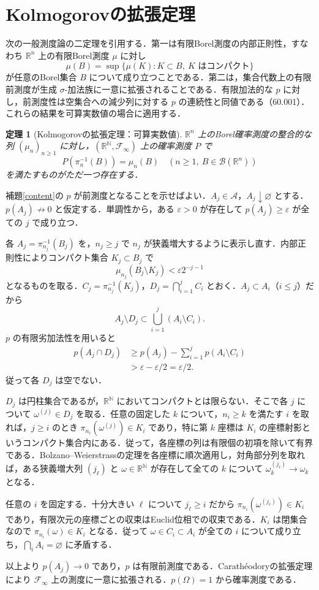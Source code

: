 \documentclass[a5paper,10pt,onecolumn]{jsarticle}
\makeatletter
\theoremstyle{mathnotetheorem}
\newtheorem{theorem}{定理}[section]
\renewcommand{\proofname}{証明}
\renewenvironment{proof}[1][\proofname]{%
  \par\pushQED{\qed}\normalfont\topsep4\p@\@plus2\p@\relax
  \trivlist\item[\hskip\labelsep\bfseries #1]\ignorespaces
}{\popQED\endtrivlist\@endpefalse}
\newcommand{\R}{\mathbb{R}}
\newcommand{\N}{\mathbb{N}}
\newcommand{\F}{\mathcal F}
\newcommand{\B}{\mathcal B}
\newcommand{\1}{\mathbf{1}}
\makeatother
\begin{document}
\section{Kolmogorovの拡張定理}
次の一般測度論の二定理を引用する．第一は有限Borel測度の内部正則性，すなわち $\R^n$ 上の有限Borel測度 $\mu$ に対し
\[
 \mu(B)=\sup\{\mu(K):K\subset B,\ K\text{ はコンパクト}\}
\]
が任意のBorel集合 $B$ について成り立つことである．第二は，集合代数上の有限前測度が生成 $\sigma$-加法族に一意に拡張されることである．有限加法的な $p$ に対し，前測度性は空集合への減少列に対する $p$ の連続性と同値である（60.001）．これらの結果を可算実数値の場合に適用する．
\begin{theorem}[Kolmogorovの拡張定理：可算実数値]\label{kolm}
$\R^n$ 上のBorel確率測度の整合的な列 $(\mu_n)_{n\ge1}$ に対し，$(\R^\N,\F_\infty)$ 上の確率測度 $P$ で
\[
 P(\pi_n^{-1}(B))=\mu_n(B)
 \quad(n\ge1,\ B\in\B(\R^n))
\]
を満たすものがただ一つ存在する．
\end{theorem}
\begin{proof}
補題\ref{content}の $p$ が前測度となることを示せばよい．$A_j\in\mathcal A$，$A_j\downarrow\varnothing$ とする．$p(A_j)\not\to0$ と仮定する．単調性から，ある $\varepsilon>0$ が存在して $p(A_j)\ge\varepsilon$ が全ての $j$ で成り立つ．

各 $A_j=\pi_{n_j}^{-1}(B_j)$ を，$n_j\ge j$ で $n_j$ が狭義増大するように表示し直す．内部正則性によりコンパクト集合 $K_j\subset B_j$ で
\[
 \mu_{n_j}(B_j\setminus K_j)<\varepsilon 2^{-j-1}
\]
となるものを取る．$C_j=\pi_{n_j}^{-1}(K_j)$，$D_j=\bigcap_{i=1}^j C_i$ とおく．$A_j\subset A_i$（$i\le j$）だから
\[
 A_j\setminus D_j\subset\bigcup_{i=1}^j(A_i\setminus C_i).
\]
$p$ の有限劣加法性を用いると
\begin{align*}
 p(A_j\cap D_j)&\ge p(A_j)-\sum_{i=1}^jp(A_i\setminus C_i)\\
 &>\varepsilon-\varepsilon/2=\varepsilon/2.
\end{align*}
従って各 $D_j$ は空でない．

$D_j$ は円柱集合であるが，$\R^\N$ においてコンパクトとは限らない．そこで各 $j$ について $\omega^{(j)}\in D_j$ を取る．任意の固定した $k$ について，$n_i\ge k$ を満たす $i$ を取れば，$j\ge i$ のとき $\pi_{n_i}(\omega^{(j)})\in K_i$ であり，特に第 $k$ 座標は $K_i$ の座標射影というコンパクト集合内にある．従って，各座標の列は有限個の初項を除いて有界である．Bolzano--Weierstrassの定理を各座標に順次適用し，対角部分列を取れば，ある狭義増大列 $(j_\ell)$ と $\omega\in\R^\N$ が存在して全ての $k$ について $\omega^{(j_\ell)}_k\to\omega_k$ となる．

任意の $i$ を固定する．十分大きい $\ell$ について $j_\ell\ge i$ だから $\pi_{n_i}(\omega^{(j_\ell)})\in K_i$ であり，有限次元の座標ごとの収束はEuclid位相での収束である．$K_i$ は閉集合なので $\pi_{n_i}(\omega)\in K_i$ となる．従って $\omega\in C_i\subset A_i$ が全ての $i$ について成り立ち，$\bigcap_i A_i=\varnothing$ に矛盾する．

以上より $p(A_j)\to0$ であり，$p$ は有限前測度である．Carath\'eodoryの拡張定理により $\F_\infty$ 上の測度に一意に拡張される．$p(\Omega)=1$ から確率測度である．
\end{proof}
\end{document}
